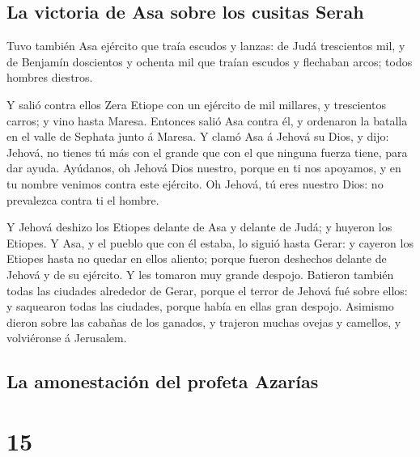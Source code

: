 \hypertarget{la-victoria-de-asa-sobre-los-cusitas-serah}{%
\subsection{La victoria de Asa sobre los cusitas
Serah}\label{la-victoria-de-asa-sobre-los-cusitas-serah}}

 Tuvo también Asa ejército que traía escudos y lanzas: de
Judá trescientos mil, y de Benjamín doscientos y ochenta mil que traían
escudos y flechaban arcos; todos hombres diestros.

 Y salió contra ellos Zera Etiope con un ejército de mil
millares, y trescientos carros; y vino hasta Maresa. 
Entonces salió Asa contra él, y ordenaron la batalla en el valle de
Sephata junto á Maresa.  Y clamó Asa á Jehová su Dios, y
dijo: Jehová, no tienes tú más con el grande que con el que ninguna
fuerza tiene, para dar ayuda. Ayúdanos, oh Jehová Dios nuestro, porque
en ti nos apoyamos, y en tu nombre venimos contra este ejército. Oh
Jehová, tú eres nuestro Dios: no prevalezca contra ti el hombre.

 Y Jehová deshizo los Etiopes delante de Asa y delante de
Judá; y huyeron los Etiopes.  Y Asa, y el pueblo que con él
estaba, lo siguió hasta Gerar: y cayeron los Etiopes hasta no quedar en
ellos aliento; porque fueron deshechos delante de Jehová y de su
ejército. Y les tomaron muy grande despojo.  Batieron
también todas las ciudades alrededor de Gerar, porque el terror de
Jehová fué sobre ellos: y saquearon todas las ciudades, porque había en
ellas gran despojo.  Asimismo dieron sobre las cabañas de
los ganados, y trajeron muchas ovejas y camellos, y volviéronse á
Jerusalem.

\hypertarget{la-amonestaciuxf3n-del-profeta-azaruxedas}{%
\subsection{La amonestación del profeta
Azarías}\label{la-amonestaciuxf3n-del-profeta-azaruxedas}}

\hypertarget{section-14}{%
\section{15}\label{section-14}}

